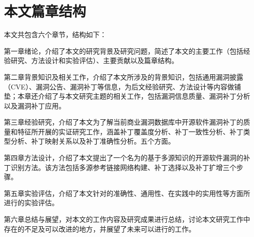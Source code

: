 \section{本文篇章结构}
本文共包含六个章节，结构如下：

第一章绪论，介绍了本文的研究背景及研究问题，简述了本文的主要工作（包括经验研究、方法设计和实验评估）、主要贡献以及篇章结构。

第二章背景知识及相关工作，介绍了本文所涉及的背景知识，包括通用漏洞披露（CVE）、漏洞公告、漏洞补丁等信息，为后文经验研究、方法设计等内容做铺垫；本章还介绍了与本文研究主题的相关工作，包括漏洞信息质量、漏洞补丁分析以及漏洞补丁应用。

第三章经验研究，介绍了本文为了解当前商业漏洞数据库中开源软件漏洞补丁的质量和特征所开展的实证研究工作，涵盖补丁覆盖度分析、补丁一致性分析、补丁类型分析、补丁映射关系以及补丁准确性分析。五个方面。

第四章\tool 方法设计，介绍了本文提出了一个名为\tool 的基于多源知识的开源软件漏洞的补丁识别方法。该方法包括多源参考链接网络构建、补丁选择以及补丁扩增三个步骤。

第五章实验评估，介绍了本文针对\tool 的准确性、通用性、在实践中的实用性等方面所进行的实验评估。

第六章总结与展望，对本文的工作内容及研究成果进行总结，讨论本文研究工作中存在的不足及可以改进的地方，并展望了未来可以进行的工作。
